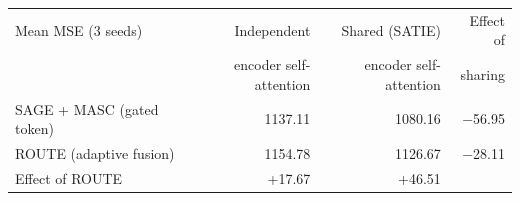 \begin{tabular}{lrrr}
\toprule
Mean MSE (3 seeds) & Independent & Shared (SATIE) & Effect of\\
 & encoder self-attention & encoder self-attention & sharing\\
\midrule
SAGE + MASC (gated token) & 1137.11 & 1080.16 & $-$56.95\\
ROUTE (adaptive fusion) & 1154.78 & 1126.67 & $-$28.11\\
\midrule
Effect of ROUTE & +17.67 & +46.51 & \\
\bottomrule
\end{tabular}
